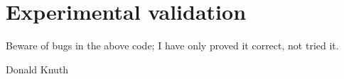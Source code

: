 \chapter{Experimental validation}
\label{capitolo6}
\thispagestyle{empty}

\epigraph{Beware of bugs in the above code; I have only proved it correct, not tried it.}{Donald Knuth}

\noindent {}
